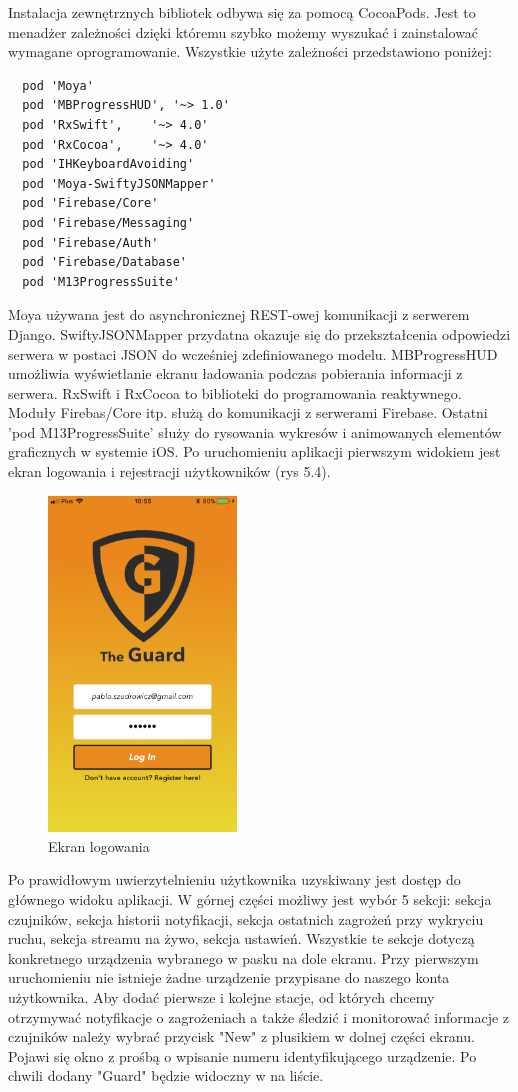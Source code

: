 Instalacja zewnętrznych bibliotek odbywa się za pomocą CocoaPods. Jest to menadżer zależności dzięki któremu szybko możemy wyszukać i zainstalować wymagane oprogramowanie. Wszystkie użyte zależności przedstawiono poniżej: 
\begin{verbatim}
  pod 'Moya'
  pod 'MBProgressHUD', '~> 1.0'
  pod 'RxSwift',    '~> 4.0'
  pod 'RxCocoa',    '~> 4.0'
  pod 'IHKeyboardAvoiding'
  pod 'Moya-SwiftyJSONMapper'
  pod 'Firebase/Core'
  pod 'Firebase/Messaging'
  pod 'Firebase/Auth'
  pod 'Firebase/Database'
  pod 'M13ProgressSuite'
\end{verbatim}
Moya używana jest do asynchronicznej REST-owej komunikacji z serwerem Django. SwiftyJSONMapper przydatna okazuje się do przekształcenia odpowiedzi serwera w postaci JSON do wcześniej zdefiniowanego modelu. MBProgressHUD umożliwia wyświetlanie ekranu ładowania podczas pobierania informacji z serwera. RxSwift i RxCocoa to biblioteki do programowania reaktywnego. Moduły Firebas/Core itp. służą do komunikacji z serwerami Firebase. Ostatni 'pod M13ProgressSuite' służy do rysowania wykresów i animowanych elementów graficznych w systemie iOS.
Po uruchomieniu aplikacji pierwszym widokiem jest ekran logowania i rejestracji użytkowników (rys 5.4). 
\begin{figure}[ht]
	\centering
	\includegraphics[width=5cm]{login.png}
	\caption{Ekran logowania}
\end{figure}
Po prawidłowym uwierzytelnieniu użytkownika uzyskiwany jest dostęp do głównego widoku aplikacji. W górnej części możliwy jest wybór 5 sekcji:
sekcja czujników, sekcja historii notyfikacji, sekcja ostatnich zagrożeń przy wykryciu ruchu, sekcja streamu na żywo, sekcja ustawień. Wszystkie te sekcje dotyczą konkretnego urządzenia wybranego w pasku na dole ekranu. Przy pierwszym uruchomieniu nie istnieje żadne urządzenie przypisane do naszego konta użytkownika. Aby dodać pierwsze i kolejne stacje, od których chcemy otrzymywać notyfikacje o zagrożeniach a także śledzić i monitorować informacje z czujników należy wybrać przycisk "New" z plusikiem w dolnej części ekranu. Pojawi się okno z prośbą o wpisanie numeru identyfikującego urządzenie. Po chwili dodany "Guard" będzie widoczny w na liście.

